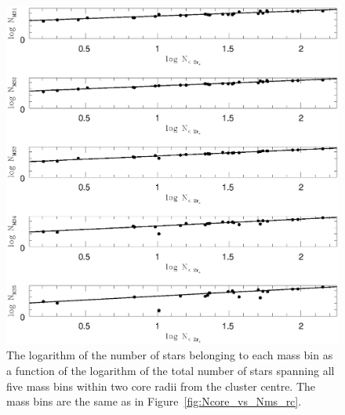 \begin{figure} [!h]
  \begin{center}
 \includegraphics[scale=0.5]{Chapter-6/Ncore_vs_Nms_2rc_new.ps}
\caption[Logarithm of the number of
stars belonging to each mass bin as a function of the
logarithm of the total number of stars spanning all five mass
bins within two core radii from the cluster centre]{The logarithm of the number of
stars belonging to each mass bin as a function of the
logarithm of the total number of stars spanning all five mass
bins within two core radii from the cluster centre.  The mass bins are
the same as in Figure~\ref{fig:Ncore_vs_Nms_rc}.
\label{fig:Ncore_vs_Nms_2rc}}
\end{center}
\end{figure}

